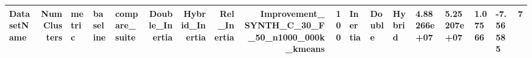 \begin{tabular}{lrlllrrrrr}
\toprule
DatasetName & NumClusters & metric & baseline & compare_suite & Double_Inertia & Hybrid_Inertia & Rel_Inertia & Improvement_%
\midrule
SYNTH_C_30_F_50_n1000_000k_kmeans & 100 & Inertia & Double & Hybrid & 4.88266e+07 & 5.25207e+07 & 1.07566 & -7.56585 & 7 \\
\bottomrule
\end{tabular}
